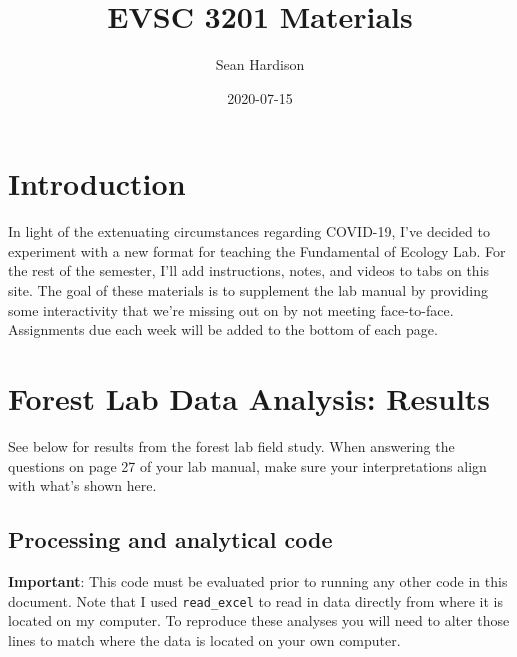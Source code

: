 \documentclass[]{book}
\title{EVSC 3201 Materials}
\author{Sean Hardison}
\date{2020-07-15}
\begin{document}
\maketitle

{
\setcounter{tocdepth}{1}
\tableofcontents
}
\chapter*{Introduction}\label{introduction}

In light of the extenuating circumstances regarding COVID-19, I've
decided to experiment with a new format for teaching the Fundamental of
Ecology Lab. For the rest of the semester, I'll add instructions, notes,
and videos to tabs on this site. The goal of these materials is to
supplement the lab manual by providing some interactivity that we're
missing out on by not meeting face-to-face. Assignments due each week
will be added to the bottom of each page.

\chapter{Forest Lab Data Analysis:
Results}\label{forest-lab-data-analysis-results}

See below for results from the forest lab field study. When answering
the questions on page 27 of your lab manual, make sure your
interpretations align with what's shown here.

\section{Processing and analytical
code}\label{processing-and-analytical-code}

\textbf{Important}: This code must be evaluated prior to running any
other code in this document. Note that I used \texttt{read\_excel} to
read in data directly from where it is located on my computer. To
reproduce these analyses you will need to alter those lines to match
where the data is located on your own computer.
\end{document}
